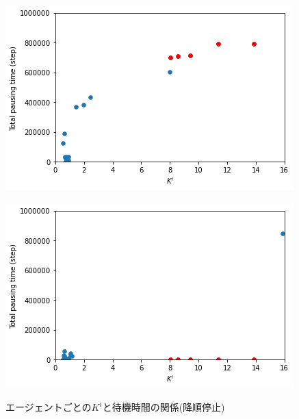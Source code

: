 \documentclass[12pt,a4j,twoside]{jarticle}
\begin{document}
  \begin{figure}
    \begin{minipage}{0.48\hsize}
      \centering
      \includegraphics[width=0.99\hsize]{figures/CorrectionScatter_Office_DescendingStop_before.png}
      \label{subfig:cscatter_DescendingStop_before}  
    \end{minipage}
    \hfill
    \begin{minipage}{0.48\hsize}
      \centering
      \includegraphics[width=0.99\hsize]{figures/CorrectionScatter_Office_DescendingStop_after.png}
      \label{subfig:cscatter_DescendingStop_after}  
    \end{minipage}
    \caption{エージェントごとの$K^i$と待機時間の関係(降順停止)}
    \label{fig:cscatter_DescendingStop}
  \end{figure}
\end{document}
